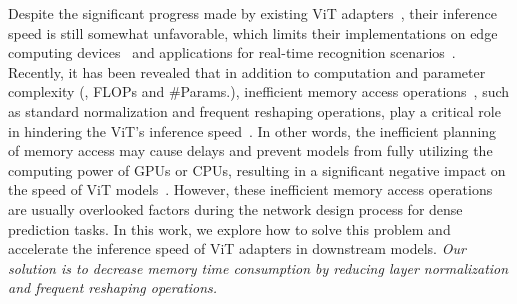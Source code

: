 Despite the significant progress made by existing ViT adapters~\citep{chen2022vision,liu2024revisiting,jie2023fact,marouf2024mini}, their inference speed is still somewhat unfavorable, which limits their implementations on edge computing devices~\citep{dong2024packqvit} and applications for real-time recognition scenarios~\citep{marouf2024mini}. 
%
Recently, it has been revealed that in addition to computation and parameter complexity (\eg, FLOPs and \#Params.), inefficient memory access operations~\citep{marouf2024mini,liu2023efficientvit}, such as standard normalization and frequent reshaping operations, play a critical role in hindering the ViT's inference speed~\citep{he2023simplifying,pan2022fast,fournier2023practical,shi2023evit}. 
%
In other words, the inefficient planning of memory access may cause delays and prevent models from fully utilizing the computing power of GPUs or CPUs, resulting in a significant negative impact on the speed of ViT models~\citep{liu2023efficientvit,dao2022flashattention,venkat2019swirl,gu2021towards,ivanov2021data}. However, these inefficient memory access operations are usually overlooked factors during the network design process for dense prediction tasks.
%
In this work, we explore how to solve this problem and accelerate the inference speed of ViT adapters in downstream models. \emph{Our solution is to decrease memory time consumption by reducing layer normalization and frequent reshaping operations.}

